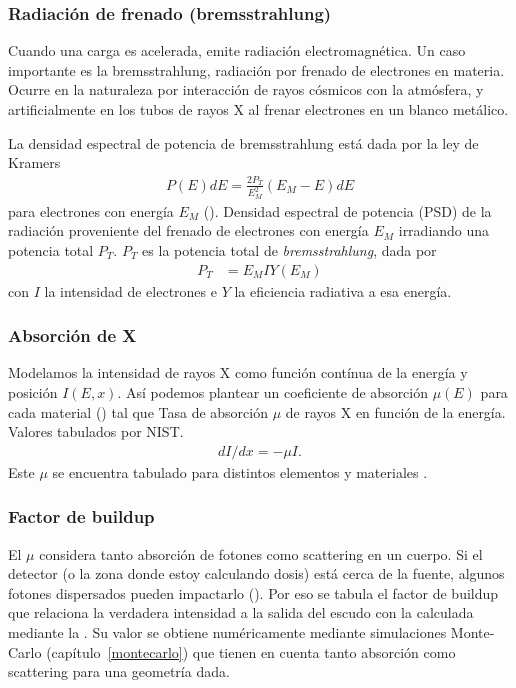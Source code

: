 \subsubsection{Radiación de frenado (bremsstrahlung)}
Cuando una carga es acelerada, emite radiación
electromagnética\cite{jackson_classical_1998}.
Un caso importante es la bremsstrahlung,
radiación por frenado de electrones en materia.
Ocurre en la naturaleza por interacción de rayos cósmicos con la atmósfera,
y artificialmente en los tubos de rayos X 
al frenar electrones en un blanco metálico.

La densidad espectral de potencia de bremsstrahlung está dada por la ley de
Kramers\cite{kramers_xciii._1923}
\begin{align}
    P(E)dE = \frac{2P_T}{E_M^2}(E_M-E)dE
    \label{eq:kramers}
\end{align} para electrones con energía $E_M$ ().
{Densidad espectral de potencia (PSD) de la radiación proveniente del 
frenado de electrones con energía $E_M$ irradiando una potencia total $P_T$.}
$P_T$ es la potencia total de \emph{bremsstrahlung}, dada por
\begin{align*}
    P_T&=E_MIY(E_M)
\end{align*}con $I$ la intensidad de electrones e $Y$ la eficiencia radiativa a
esa energía.
\subsubsection{Absorción de X}
Modelamos la intensidad de rayos X como función contínua de la energía y
posición $I(E,x)$.
Así podemos plantear un coeficiente de absorción $\mu(E)$ para cada 
material () tal que 
{Tasa de absorción $\mu$ de rayos X en función de la energía.
    Valores tabulados por NIST\cite{xraycoef}.}
\begin{align}
    \label{eq:absorcionx}
    dI/dx=-\mu I.
\end{align}
Este $\mu$ se encuentra tabulado para distintos elementos y materiales
\cite{xraycoef}.
\subsubsection{Factor de buildup}
El $\mu$ considera tanto absorción de fotones como scattering en un cuerpo.
Si el detector (o la zona donde estoy calculando dosis) 
está cerca de la fuente, 
algunos fotones dispersados pueden impactarlo ().
Por eso se tabula el factor de buildup
que relaciona la verdadera intensidad a la salida del escudo 
con la calculada mediante la .
Su valor se obtiene numéricamente mediante simulaciones Monte-Carlo
(capítulo~\ref{montecarlo})
que tienen en cuenta tanto absorción como scattering
para una geometría dada.
